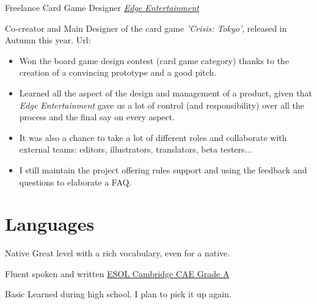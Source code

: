 \documentclass[11pt,a4paper,roman]{moderncv}
\begin{document}
	{Freelance Card Game Designer}
	{ \textit{\href{http://edgeent.com}{Edge Entertainment}}}
	{}
	{}
	{Co-creator and Main Designer of the card game \textit{'Crisis: Tokyo'}, released in Autumn this year. Url: 
\begin{itemize}
	\item Won the board game design contest (card game category) thanks to the 
	creation of a convincing prototype and a good pitch.
	\item Learned all the aspect of the design and management of a product, given 
	that \textit{Edge Entertainment} gave us a lot of control (and responsibility) 
	over all the process and the final say on every aspect.
	\item It was also a chance to take a lot of different roles and collaborate 
	with external teams: editors, illustrators, translators, beta testers...
	\item I still maintain the project offering rules support and using the feedback
	and questions to elaborate a FAQ.
\end{itemize}}




\section{Languages}
	{Native}
	{Great level with a rich vocabulary, even for a native.}

	{Fluent spoken and written}
	{\href{https://dl.dropbox.com/u/87894135/StatementOfResult.pdf}
	{ESOL Cambridge CAE Grade A}}

	{Basic}
	{Learned during high school. I plan to pick it up again.}

\end{document}
